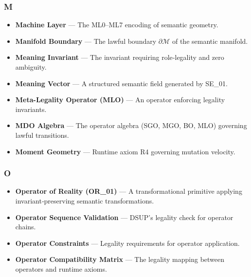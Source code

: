 \subsubsection*{M}
\begin{itemize}
    \item \textbf{Machine Layer} — The ML0–ML7 encoding of semantic geometry.

    \item \textbf{Manifold Boundary} — The lawful boundary $\partial \mathcal{M}$
    of the semantic manifold.

    \item \textbf{Meaning Invariant} — The invariant requiring role‑legality and
    zero ambiguity.

    \item \textbf{Meaning Vector} — A structured semantic field generated by
    SE\_01.

    \item \textbf{Meta-Legality Operator (MLO)} — An operator enforcing legality
    invariants.

    \item \textbf{MDO Algebra} — The operator algebra (SGO, MGO, BO, MLO)
    governing lawful transitions.

    \item \textbf{Moment Geometry} — Runtime axiom R4 governing mutation
    velocity.
\end{itemize}


\subsubsection*{O}
\begin{itemize}
    \item \textbf{Operator of Reality (OR\_01)} — A transformational primitive
    applying invariant‑preserving semantic transformations.

    \item \textbf{Operator Sequence Validation} — DSUP’s legality check for
    operator chains.

    \item \textbf{Operator Constraints} — Legality requirements for operator
    application.

    \item \textbf{Operator Compatibility Matrix} — The legality mapping between
    operators and runtime axioms.
\end{itemize}


